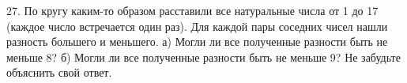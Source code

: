 27. По кругу каким-то образом расставили все натуральные числа от 1 до 17 (каждое число встречается один раз). Для каждой пары соседних чисел нашли разность большего и меньшего. а) Могли ли все полученные разности быть не меньше 8? б) Могли ли все полученные разности быть не меньше 9? Не забудьте объяснить свой ответ.\\
